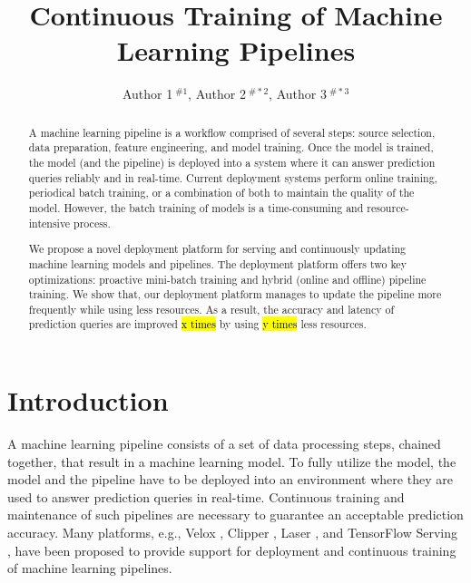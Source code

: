 \documentclass[10pt,conference,letterpaper]{IEEEtran}
\title{Continuous Training of Machine Learning Pipelines}
\author{
{Author 1{\small $~^{\# 1}$}, Author 2{\small $~^{\# *2}$}, Author 3{\small $~^{\# *3}$} }}
\begin{document}
\maketitle
\begin{abstract}
A machine learning pipeline is a workflow comprised of several steps: source selection, data preparation, feature engineering, and model training. 
Once the model is trained, the model (and the pipeline) is deployed into a system where it can answer prediction queries reliably and in real-time.
Current deployment systems perform online training, periodical batch training, or a combination of both to maintain the quality of the model.
However, the batch training of models is a time-consuming and resource-intensive process.

We propose a novel deployment platform for serving and continuously updating machine learning models and pipelines.
The deployment platform offers two key optimizations: proactive mini-batch training and hybrid (online and offline) pipeline training.
We show that, our deployment platform manages to update the pipeline more frequently while using less resources.
As a result, the accuracy and latency of prediction queries are improved \hl{x times} by using \hl{y times} less resources.
\end{abstract}


\section{Introduction} \label{introduction}
A machine learning pipeline consists of a set of data processing steps, chained together, that result in a machine learning model.
To fully utilize the model,  the model and the pipeline have to be deployed into an environment where they are used to answer prediction queries in real-time.
Continuous training and maintenance of such pipelines are necessary to guarantee an acceptable prediction accuracy.
Many platforms, e.g., Velox \cite{crankshaw2014missing}, Clipper \cite{crankshaw2016clipper}, Laser \cite{agarwal2014laser}, and TensorFlow Serving \cite{abadi2016tensorflow}, have been proposed to provide support for deployment and continuous training of machine learning pipelines. 
\end{document}

